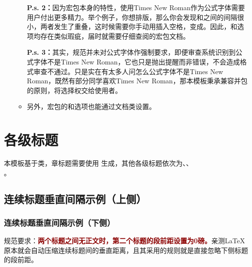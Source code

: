 \documentclass[doctor, vlined]{DissertUESTC}
\begin{document}
\begin{itemize}
\begin{itemize}
			\textbf{P.s. 2：}因为\href{https://mirrors.pku.edu.cn/ctan/macros/xetex/latex/mathspec/mathspec.pdf}{\ttfamily\color{DarkRed}}宏包本身的特性，使用Times New Roman作为公式字体需要用户付出更多精力。举个例子，你想排版，那么你会发现和之间的间隔很小，两者发生了重叠，这时候需要你手动用插入空格，变成。因此，和选项均存在类似瑕疵，届时就需要仔细查阅\href{https://mirrors.pku.edu.cn/ctan/macros/xetex/latex/mathspec/mathspec.pdf}{\ttfamily\color{DarkRed}}的宏包文档。

			\textbf{P.s. 3：}其实，规范并未对公式字体作强制要求，即便审查系统识别到公式字体不是Times New Roman，它也只是抛出提醒而非错误，不会造成格式审查不通过。只是实在有太多人问怎么公式字体不是Times New Roman，既然有部分同学喜欢Times New Roman，那本模板秉承兼容并包的原则，将选择权交给使用者。

			\item 另外，\href{https://mirrors.sustech.edu.cn/CTAN/macros/latex/contrib/algorithm2e/doc/algorithm2e.pdf}{\ttfamily\color{DarkRed}}宏包的和选项也能通过文档类设置。
		\end{itemize}
	\end{itemize}
	
	\section{各级标题}
	
	本模板基于类，章标题需要使用 生成，其他各级标题依次为、、\\ 。

	\subsection{连续标题垂直间隔示例（上侧）}\vspace*{-10bp}
	\subsubsection{连续标题垂直间隔示例（下侧）}

	规范要求：\textbf{\textcolor{DarkRed}{两个标题之间无正文时，第二个标题的段前距设置为0磅。}}亲测LaTeX原本就会自动压缩连续标题间的垂直距离，且其采用的规则就是直接忽略下侧标题的段前距。
	
\end{document}
